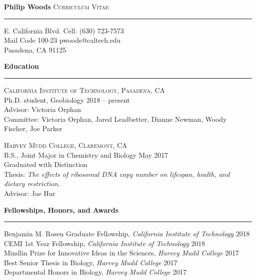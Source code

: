 \documentclass{article}
\newcommand{\cvtitle}[1]{%
	{\Large \textbf{#1}} \hfill {\large \textsc{Curriculum Vitae}}
	\hrule
}
\newcommand{\cvsection}[1]{%
	{\large \textbf{#1\phantom{,}}}
	\hrule
}
\begin{document}
\cvtitle{Philip Woods}
 E. California Blvd.	\hfill	Cell: (630) 723-7573\\
Mail Code 100-23			\hfill	pwoods@caltech.edu\\
Pasadena, CA 91125			\hfill	%
\bigskip


\cvsection{Education}
\bigskip

\textsc{California Institute of Technology, Pasadena, CA}\\
Ph.D. student, Geobiology		\hfill	2018 -- present\\
Advisor: Victoria Orphan\\
Committee: Victoria Orphan, Jared Leadbetter, Dianne Newman, Woody Fischer, Joe Parker

\medskip

\textsc{Harvey Mudd College, Claremont, CA}\\
B.S., Joint Major in Chemistry and Biology	\hfill	May 2017\\
Graduated with Distinction\\
Thesis: \emph{The effects of ribosomal DNA copy number on lifespan, health, and dietary restriction.}\\
Advisor: Jae Hur

\bigskip

%
%

\cvsection{Fellowships, Honors, and Awards}
\bigskip

Benjamin M. Rosen Graduate Fellowship, \emph{California Institute of Technology}	\hfill	2018\\
CEMI 1st Year Fellowship, \emph{California Institute of Technology}				\hfill	2018\\
Mindlin Prize for Innovative Ideas in the Sciences, \emph{Harvey Mudd College}		\hfill	2017\\
Best Senior Thesis in Biology, \emph{Harvey Mudd College}						\hfill	2017\\
Departmental Honors in Biology, \emph{Harvey Mudd College}					\hfill	2017%

\bigskip
\end{document}
